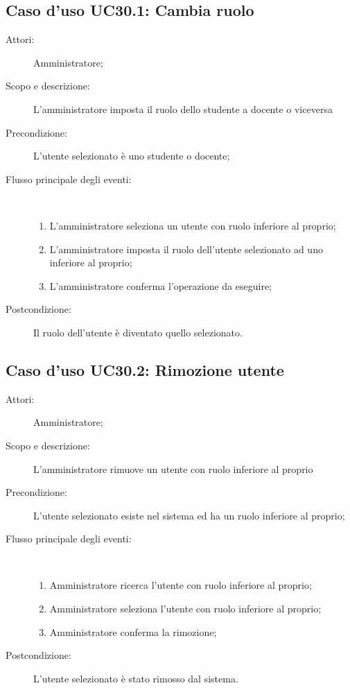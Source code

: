 \subsection{Caso d'uso UC30.1: Cambia ruolo}\begin{description}
	\item[Attori:] Amministratore;
	\item[Scopo e descrizione:] L'amministratore imposta il ruolo dello studente a docente o viceversa
	\item[Precondizione:] L'utente selezionato è uno studente o docente;
	
	\item[Flusso principale degli eventi:] \ 
	\begin{enumerate}
		\item L'amministratore seleziona un utente con ruolo inferiore al proprio;
		\item L'amministratore imposta il ruolo dell'utente selezionato ad uno inferiore al proprio;
		\item L'amministratore conferma l'operazione da eseguire;
		
	\end{enumerate}
	\item[Postcondizione:] Il ruolo dell'utente è diventato quello selezionato.
\end{description}
\hypertarget{UC30.2}{}
\subsection{Caso d'uso UC30.2: Rimozione utente}\begin{description}
	\item[Attori:] Amministratore;
	\item[Scopo e descrizione:] L'amministratore rimuove un utente con ruolo inferiore al proprio
	\item[Precondizione:] L'utente selezionato esiste nel sistema ed ha un ruolo inferiore al proprio;
	
	\item[Flusso principale degli eventi:] \ 
	\begin{enumerate}
		\item Amministratore ricerca l'utente con ruolo inferiore al proprio;
		\item Amministratore seleziona l'utente con ruolo inferiore al proprio;
		\item Amministratore conferma la rimozione;
		
	\end{enumerate}
	\item[Postcondizione:] L'utente selezionato è stato rimosso dal sistema.
\end{description}
\hypertarget{UC31}{}
